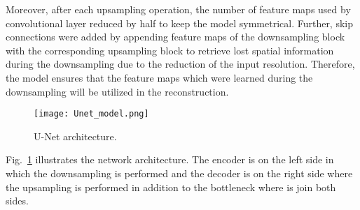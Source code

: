 Moreover, after each upsampling operation, the number of feature maps used by convolutional layer reduced by half to keep the model symmetrical. 
Further, skip connections were added by appending feature maps of the downsampling block with the corresponding upsampling block to retrieve lost spatial information during the downsampling due to the reduction of the input resolution.
Therefore, the model ensures that the feature maps which were learned during the downsampling will be utilized in the reconstruction. 
\begin{figure} [h!]
	\begin{center}
		\texttt{[image: Unet\_model.png]}
	\end{center}
	\caption{U-Net architecture.} 
	\label{fig:Unet}
\end{figure}
Fig.~\ref{fig:Unet}  illustrates the network architecture. 
The encoder is on the left side in which the downsampling is performed and the decoder is on the right side where the upsampling is performed in addition to the bottleneck where is join both sides.
